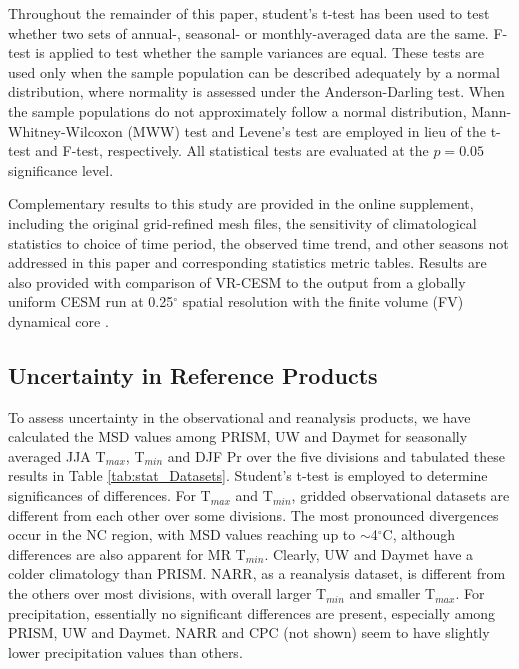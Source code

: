 Throughout the remainder of this paper, student's t-test has been used to test whether two sets of annual-, seasonal- or monthly-averaged data are the same. F-test is applied to test whether the sample variances are equal. These tests are used only when the sample population can be described adequately by a normal distribution, where normality is assessed under the Anderson-Darling test. When the sample populations do not approximately follow a normal distribution, Mann-Whitney-Wilcoxon (MWW) test and Levene's test are employed in lieu of the t-test and F-test, respectively. All statistical tests are evaluated at the $p = 0.05$ significance level.

Complementary results to this study are provided in the online supplement, including the original grid-refined mesh files, the sensitivity of climatological statistics to choice of time period, the observed time trend, and other seasons not addressed in this paper and corresponding statistics metric tables. Results are also provided with comparison of VR-CESM to the output from a globally uniform CESM run at 0.25$^\circ$ spatial resolution with the finite volume (FV) dynamical core \cite{wehner2014effect}.

\subsection{Uncertainty in Reference Products}

To assess uncertainty in the observational and reanalysis products, we have calculated the MSD values among PRISM, UW and Daymet for seasonally averaged JJA T$_{max}$, T$_{min}$ and DJF Pr over the five divisions and tabulated these results in Table \ref{tab:stat_Datasets}. Student's t-test is employed to determine significances of differences. For T$_{max}$ and T$_{min}$, gridded observational datasets are different from each other over some divisions.  The most pronounced divergences occur in the NC region, with MSD values reaching up to $\sim$4$^\circ$C, although differences are also apparent for MR T$_{min}$. Clearly, UW and Daymet have a colder climatology than PRISM. NARR, as a reanalysis dataset, is different from the others over most divisions, with overall larger T$_{min}$ and smaller T$_{max}$. For precipitation, essentially no significant differences are present, especially among PRISM, UW and Daymet. NARR and CPC (not shown) seem to have slightly lower precipitation values than others.

